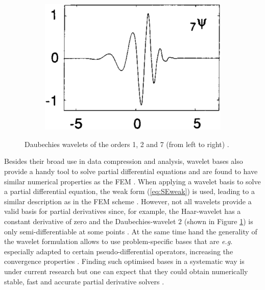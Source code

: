 \begin{figure}
\begin{subfigure}{0.32\textwidth}
   \end{subfigure}
   \begin{subfigure}{0.32\textwidth}
   \includegraphics[width=\textwidth]{Figures/Daubechies7}
   \end{subfigure}
   \caption{Daubechies wavelets of the orders 1, 2 and 7 (from left to right) \cite{daubechies}.}
   \label{fig:wavelets}
\end{figure}

Besides their broad use in data compression and analysis, wavelet bases also provide a handy tool to solve partial differential equations and are found to have similar numerical properties as the FEM \cite{FdFeWavelet}.
When applying a wavelet basis to solve a partial differential equation, the weak form (\ref{eq:SEweak}) is used, leading to a similar description as in the FEM scheme \cite{dahlke}.
However, not all wavelets provide a valid basis for partial derivatives since, for example, the Haar-wavelet has a constant derivative of zero and the Daubechies-wavelet $2$ (shown in Figure \ref{fig:wavelets}) is only semi-differentiable at some points \cite{WaveletChem}.
At the same time hand the generality of the wavelet formulation allows to use problem-specific bases that are \textit{e.g.} especially adapted to certain pseudo-differential operators, increasing the convergence properties \cite{dahlke}.
Finding such optimised bases in a systematic way is under current research but one can expect that they could obtain numerically stable, fast and accurate partial derivative solvers \cite{dahlke,kunoth}.
